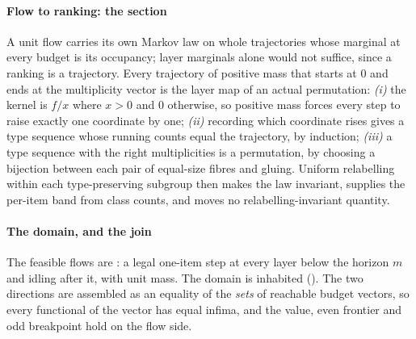 \paragraph{Flow to ranking: the section} A unit flow carries its own Markov law on whole
trajectories whose marginal at every budget is its occupancy; layer marginals alone would
not suffice, since a ranking is a trajectory. Every trajectory of positive mass that starts
at $0$ and ends at the multiplicity vector is the layer map of an actual permutation:
\emph{(i)} the kernel is $f/x$ where $x>0$ and $0$ otherwise, so positive mass forces every
step to raise exactly one coordinate by one; \emph{(ii)} recording which coordinate rises
gives a type sequence whose running counts equal the trajectory, by induction; \emph{(iii)} a
type sequence with the right multiplicities is a permutation, by choosing a bijection
between each pair of equal-size fibres and gluing. Uniform relabelling within each
type-preserving subgroup then makes the law invariant, supplies the per-item band from class
counts, and moves no relabelling-invariant quantity.


\paragraph{The domain, and the join} The feasible flows are : a legal
one-item step at every layer below the horizon $m$ and idling after it, with unit mass. The
domain is inhabited (). The two directions are assembled as an equality
of the \emph{sets} of reachable budget vectors, so every functional of the vector has equal
infima, and the value, even frontier and odd breakpoint hold on the flow side.


